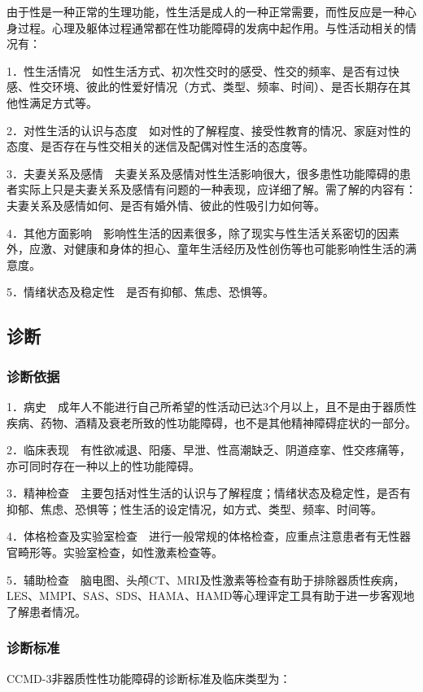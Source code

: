 由于性是一种正常的生理功能，性生活是成人的一种正常需要，而性反应是一种心身过程。心理及躯体过程通常都在性功能障碍的发病中起作用。与性活动相关的情况有：

1．性生活情况　如性生活方式、初次性交时的感受、性交的频率、是否有过快感、性交环境、彼此的性爱好情况（方式、类型、频率、时间）、是否长期存在其他性满足方式等。

2．对性生活的认识与态度　如对性的了解程度、接受性教育的情况、家庭对性的态度、是否存在与性交相关的迷信及配偶对性生活的态度等。

3．夫妻关系及感情　夫妻关系及感情对性生活影响很大，很多患性功能障碍的患者实际上只是夫妻关系及感情有问题的一种表现，应详细了解。需了解的内容有：夫妻关系及感情如何、是否有婚外情、彼此的性吸引力如何等。

4．其他方面影响　影响性生活的因素很多，除了现实与性生活关系密切的因素外，应激、对健康和身体的担心、童年生活经历及性创伤等也可能影响性生活的满意度。

5．情绪状态及稳定性　是否有抑郁、焦虑、恐惧等。

\subsection{诊断}

\subsubsection{诊断依据}

1．病史　成年人不能进行自己所希望的性活动已达3个月以上，且不是由于器质性疾病、药物、酒精及衰老所致的性功能障碍，也不是其他精神障碍症状的一部分。

2．临床表现　有性欲减退、阳痿、早泄、性高潮缺乏、阴道痉挛、性交疼痛等，亦可同时存在一种以上的性功能障碍。

3．精神检查　主要包括对性生活的认识与了解程度；情绪状态及稳定性，是否有抑郁、焦虑、恐惧等；性生活的设定情况，如方式、类型、频率、时间等。

4．体格检查及实验室检查　进行一般常规的体格检查，应重点注意患者有无性器官畸形等。实验室检查，如性激素检查等。

5．辅助检查　脑电图、头颅CT、MRI及性激素等检查有助于排除器质性疾病，LES、MMPI、SAS、SDS、HAMA、HAMD等心理评定工具有助于进一步客观地了解患者情况。

\subsubsection{诊断标准}

CCMD-3非器质性性功能障碍的诊断标准及临床类型为：

